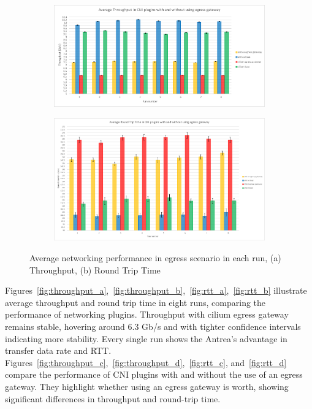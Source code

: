 \begin{figure}[H]
    \centering
    \begin{subfigure}[b]{0.7\textwidth}
        \includegraphics[width=\textwidth]{plots/egress/throughput_all.png}
        \caption{}
        \label{fig:throughput_all}
    \end{subfigure}
    \begin{subfigure}[b]{0.7\textwidth}
        \includegraphics[width=\textwidth]{plots/egress/rtt_all.png}
        \caption{}
        \label{fig:rtt_all}
    \end{subfigure}
    
    \caption{Average networking performance in egress scenario in each run, (a) Throughput, (b) Round Trip Time}
    \label{fig:networking_avg_all}
\end{figure}




Figures~\ref{fig:throughput_a},~\ref{fig:throughput_b},~\ref{fig:rtt_a},~\ref{fig:rtt_b} illustrate average throughput and round trip time in eight runs, comparing the performance of networking plugins. Throughput with cilium egress gateway remains stable, hovering around 6.3 Gb/s and with tighter confidence intervals indicating more stability. Every single run shows the Antrea's advantage in transfer data rate and RTT.
Figures~\ref{fig:throughput_c},~\ref{fig:throughput_d},~\ref{fig:rtt_c}, and~\ref{fig:rtt_d} compare the performance of CNI plugins with and without the use of an egress gateway. They highlight whether using an egress gateway is worth, showing significant differences in throughput and round-trip time.


